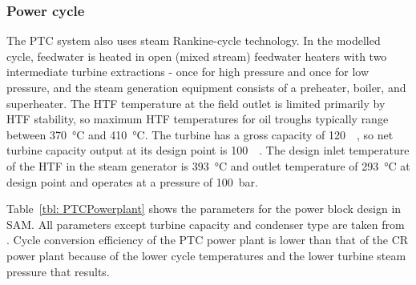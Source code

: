 \subsubsection{Power cycle}

The PTC system also uses steam Rankine-cycle technology. In the modelled cycle, feedwater is heated in open (mixed stream) feedwater heaters with two intermediate turbine extractions - once for high pressure and once for low pressure, and the steam generation equipment consists of a preheater, boiler, and superheater. The HTF temperature at the field outlet is limited primarily by HTF stability, so maximum HTF temperatures for oil troughs typically range between \SI{370}{\celsius} and \SI{410}{\celsius}. The turbine has a gross capacity of \SI{120}{\mega\wattel}, so net turbine capacity output at its design point is \SI{100}{\mega\wattel}. The design inlet temperature of the HTF in the steam generator is \SI{393}{\celsius} and outlet temperature of \SI{293}{\celsius} at design point and operates at a pressure of \SI{100}{\bar}.

Table~\ref{tbl: PTCPowerplant} shows the parameters for the power block design in SAM. All parameters except turbine capacity and condenser type are taken from \cite{Wagner2011}. Cycle conversion efficiency of the PTC power plant is lower than that of the CR power plant because of the lower cycle temperatures and the lower turbine steam pressure that results.

